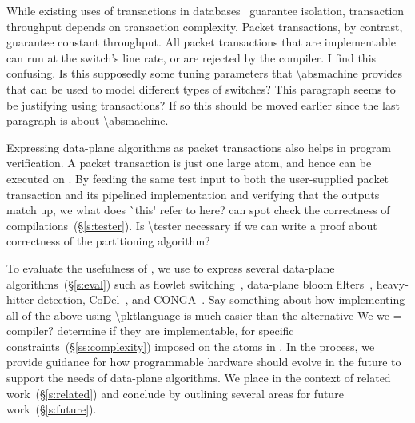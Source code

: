 While existing uses of transactions in databases~\cite{db_trans} guarantee
isolation, transaction throughput depends on transaction complexity. Packet
transactions, by contrast, guarantee constant throughput. All packet
transactions that are implementable can run at the switch's line rate, or are
rejected by the compiler.
\ac{I find this confusing. Is this supposedly some tuning parameters that  
\absmachine provides that can be used to model different types of switches?}  
\ac{This paragraph seems to be justifying using transactions? If so this 
should be moved earlier since the last paragraph is about \absmachine.}   

Expressing data-plane algorithms as packet transactions also helps in program
verification.  A packet transaction is just one large atom, and hence can be
executed on \absmachine.  By feeding the same test input to both the
user-supplied packet transaction and its pipelined implementation and verifying
that the outputs match up, we \ac{what does `this' refer to here?} 
can spot check the correctness of
compilations~(\S\ref{s:tester}).
\ac{Is \tester necessary if we can write
a proof about correctness of the partitioning algorithm?} 

To evaluate the usefulness of \pktlanguage, we use
\pktlanguage to express several data-plane algorithms~(\S\ref{s:eval})
such as flowlet switching~\cite{flowlets}, data-plane bloom
filters~\cite{bloom}, heavy-hitter detection, CoDel~\cite{codel}, and
CONGA~\cite{conga}. 
\ac{Say something about how implementing all of the above using \pktlanguage  
is much easier than the alternative}
We \ac{we = compiler?} determine if they are implementable, for specific
constraints~(\S\ref{ss:complexity}) imposed on the atoms in \absmachine. In the
process, we provide guidance for how programmable hardware should evolve in the
future to support the needs of data-plane algorithms.  We place \pktlanguage in
the context of related work~(\S\ref{s:related}) and conclude by outlining several
areas for future work~(\S\ref{s:future}).
